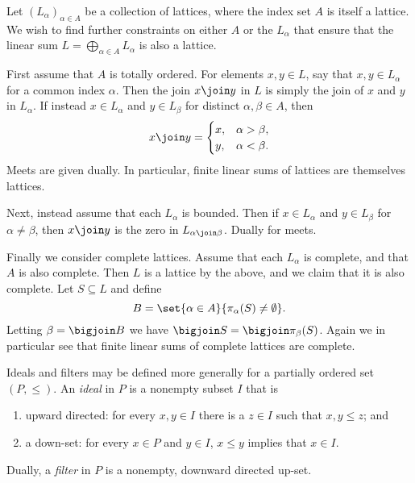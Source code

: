 \documentclass[article, a4paper, 11pt, oneside]{memoir}
\numberwithin{equation}{chapter}
\theoremstyle{nonumberplain}
\begin{document}
\begin{remarkbreak}
    Let $(L_\alpha)_{\alpha \in A}$ be a collection of lattices, where the index set $A$ is itself a lattice. We wish to find further constraints on either $A$ or the $L_\alpha$ that ensure that the linear sum $L = \bigoplus_{\alpha \in A} L_\alpha$ is also a lattice.
    
    First assume that $A$ is totally ordered. For elements $x,y \in L$, say that $x,y \in L_\alpha$ for a common index $\alpha$. Then the join $x \join y$ in $L$ is simply the join of $x$ and $y$ in $L_\alpha$. If instead $x \in L_\alpha$ and $y \in L_\beta$ for distinct $\alpha,\beta \in A$, then
    \begin{equation*}
        x \join y =
        \begin{cases}
            x, & \alpha > \beta, \\
            y, & \alpha < \beta.
        \end{cases}
    \end{equation*}
    Meets are given dually. In particular, finite linear sums of lattices are themselves lattices.

    Next, instead assume that each $L_\alpha$ is bounded. Then if $x \in L_\alpha$ and $y \in L_\beta$ for $\alpha \neq \beta$, then $x \join y$ is the zero in $L_{\alpha \join \beta}$. Dually for meets.

    Finally we consider complete lattices. Assume that each $L_\alpha$ is complete, and that $A$ is also complete. Then $L$ is a lattice by the above, and we claim that it is also complete. Let $S \subseteq L$ and define
    \begin{equation*}
        B
            = \set{\alpha \in A}{\pi_\alpha(S) \neq \emptyset}.
    \end{equation*}
    Letting $\beta = \bigjoin B$ we have $\bigjoin S = \bigjoin \pi_\beta(S)$. Again we in particular see that finite linear sums of complete lattices are complete.
\end{remarkbreak}


\begin{remarkbreak}
    Ideals and filters may be defined more generally for a partially ordered set $(P,\leq)$. An \emph{ideal} in $P$ is a nonempty subset $I$ that is
    \begin{enumerate}
        \item upward directed: for every $x,y \in I$ there is a $z \in I$ such that $x,y \leq z$; and
        \item a down-set: for every $x \in P$ and $y \in I$, $x \leq y$ implies that $x \in I$.
    \end{enumerate}
    Dually, a \emph{filter} in $P$ is a nonempty, downward directed up-set.
\end{remarkbreak}
\end{document}
